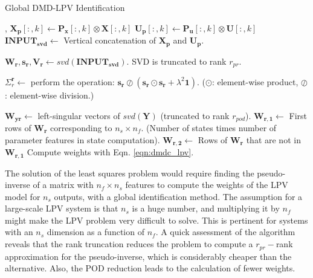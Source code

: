 \begin{algorithm}
  \caption{Global DMD-LPV Identification\label{alg:global:LPV}}
  \begin{algorithmic}[1] 
    , 
    \State $\mathbf{X_p}[:,k] \gets \mathbf{P_x}[:,k] \otimes \mathbf{X}[:,k]$
    \State $\mathbf{U_p}[:,k] \gets \mathbf{P_u}[:,k] \otimes \mathbf{U}[:,k]$   
    \EndFor
    \State $\mathbf{INPUT_{svd}} \gets $ Vertical concatenation of $\mathbf{X_p}$ and $\mathbf{U_p}$.
    
    \State $\mathbf{W_r},\mathbf{s_r},\mathbf{V_r} \gets svd(\mathbf{INPUT_{svd}})$. SVD is truncated to rank $r_{pr}$.
    
    \State $\Sigma_r^{\mathbf{r}} \gets$ perform the operation: $\mathbf{s_r} \oslash( \mathbf{s_r}\odot \mathbf{s_r} + \lambda^2\mathbf{1})$. ($\odot$: element-wise product, $\oslash$: element-wise division.)
    
    \State $\mathbf{W_{yr}} \gets$ left-singular vectors of $svd(\mathbf{Y})$ (truncated to rank $r_{pod}$).
    \State $\mathbf{W_{r,1}} \gets $ First rows of $\mathbf{W_r}$ corresponding to $n_s \times n_f$. (Number of states times number of parameter features in state computation).
    \State $\mathbf{W_{r,2}} \gets $ Rows of $\mathbf{W_r}$ that are not in $\mathbf{W_{r,1}}$
    \State Compute weights with Eqn. \eqref{eqn:dmdc_lpv}.
  \end{algorithmic}
\end{algorithm}


The solution of the least squares problem would require finding the pseudo-inverse of a matrix with $n_f \times n_s$ features to compute the weights of the LPV model for $n_s$ outputs, with a global identification method.
%
The assumption for a large-scale LPV system is that $n_s$ is a huge number, and multiplying it by $n_f$ might make the LPV problem very difficult to solve.
%
This is pertinent for systems with an $n_s$ dimension as a function of $n_f$.
%
A quick assessment of the algorithm reveals that
the rank truncation reduces the problem to compute a $r_{pr}-$rank approximation for the pseudo-inverse, which is considerably cheaper than the alternative.
%
Also, the POD reduction leads to the calculation of fewer weights.


